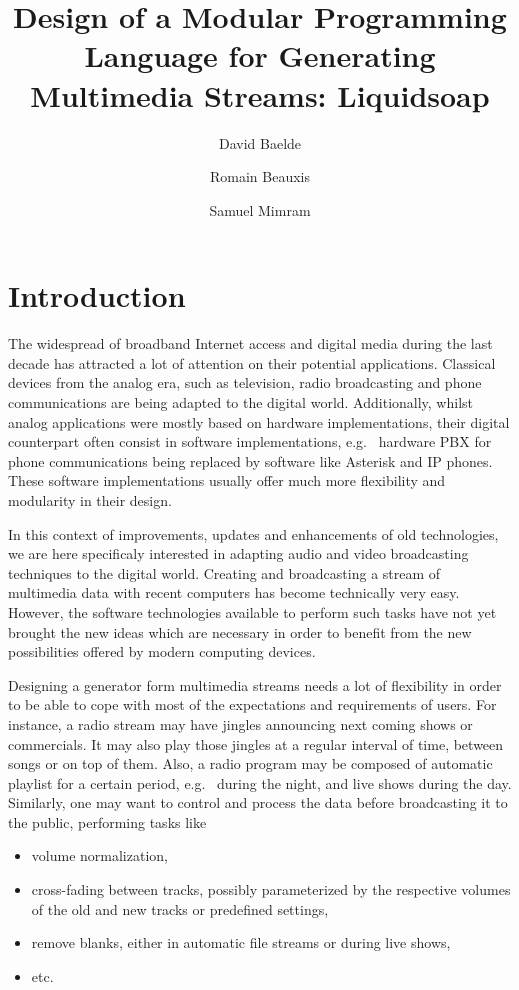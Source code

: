 \documentclass{llncs}
\title{Design of a Modular Programming Language for Generating Multimedia Streams: Liquidsoap}
\author{David Baelde \and Romain Beauxis \and Samuel Mimram}
\newcommand{\eg}{e.g.~}
\begin{document}
\maketitle

\section*{Introduction}
The widespread of broadband Internet access and digital media during the last
decade has attracted a lot of attention on their potential applications.
Classical devices from the analog era, such as television, radio broadcasting
and phone communications are being adapted to the digital world. Additionally,
whilst analog applications were mostly based on hardware implementations, their
digital counterpart often consist in software implementations, \eg{} hardware
PBX for phone communications being replaced by software like Asterisk and IP
phones. These software implementations usually offer much more flexibility and
modularity in their design.

In this context of improvements, updates and enhancements of old technologies,
we are here specificaly interested in adapting audio and video broadcasting
techniques to the digital world. Creating and broadcasting a stream of
multimedia data with recent computers has become technically very easy. However,
the software technologies available to perform such tasks have not yet brought
the new ideas which are necessary in order to benefit from the new possibilities
offered by modern computing devices.

Designing a generator form multimedia streams needs a lot of flexibility in
order to be able to cope with most of the expectations and requirements of
users. For instance, a radio stream may have jingles announcing next coming
shows or commercials. It may also play those jingles at a regular interval of
time, between songs or on top of them. Also, a radio program may be composed of
automatic playlist for a certain period, \eg{} during the night, and live shows
during the day. Similarly, one may want to control and process the data before
broadcasting it to the public, performing tasks like
\begin{itemize}
 \item volume normalization,
 \item cross-fading between tracks, possibly parameterized by the respective
   volumes of the old and new tracks or predefined settings,
 \item remove blanks, either in automatic file streams or during live shows,
 \item etc.
\end{itemize}
\end{document}

